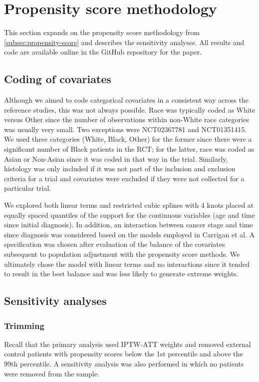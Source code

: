 \documentclass[11pt,final,fleqn]{article}\usepackage[]{graphicx}\usepackage[]{color}
\begin{document}
\section{Propensity score methodology} \label{appendix:ps}
This section expands on the propensity score methodology from \autoref{subsec:propensity-score} and describes the sensitivity analyses. All results and code are available online in the GitHub repository for the paper.

\subsection{Coding of covariates}
Although we aimed to code categorical covariates in a consistent way across the reference studies, this was not always possible. Race was typically coded as White versus Other since the number of observations within non-White race categories was usually very small. Two exceptions were NCT02367781 and NCT01351415. We used three categories (White, Black, Other) for the former since there were a significant number of Black patients in the RCT; for the latter, race was coded as Asian or Non-Asian since it was coded in that way in the trial. Similarly, histology was only included if it was not part of the inclusion and exclusion criteria for a trial and covariates were excluded if they were not collected for a particular trial.

We explored both linear terms and restricted cubic splines with 4 knots placed at equally spaced quantiles of the support for the continuous variables (age and time since initial diagnosis). In addition, an interaction between cancer stage and time since diagnosis was considered based on the models employed in Carrigan et al.\cite{carrigan2020using} A specification was chosen after evaluation of the balance of the covariates subsequent to population adjustment with the propensity score methods. We ultimately chose the model with linear terms and no interactions since it tended to  result in the best balance and was less likely to generate extreme weights. 

\subsection{Sensitivity analyses}

\subsubsection{Trimming}
Recall that the primary analysis used IPTW-ATT weights and removed external control patients with propensity scores below the 1st percentile and above the 99th percentile. A sensitivity analysis was also performed in which no patients were removed from the sample.
\end{document}
